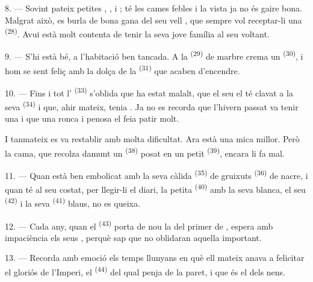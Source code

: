 8. --- Sovint pateix petites , ,
 i ; té les cames febles i la vista ja
no és gaire bona. Malgrat això, es burla de bona gana del seu vell
, que sempre vol receptar-li una 
\textsuperscript{(28)}. Avui està molt contenta de tenir la seva jove família al seu voltant.

9. --- S'hi està bé, a l'habitació ben tancada. A la 
\textsuperscript{(29)} de marbre crema un  \textsuperscript{(30)}, i hom
se sent feliç amb la dolça  de la
 \textsuperscript{(31)} que acaben d'encendre.

\VUsaut{4.2mm}
\VUsaut{3.0mm}

10. --- Fins i tot l' \textsuperscript{(33)} s'oblida que ha estat malalt, que el
seu  el té clavat a la seva  \textsuperscript{(34)} i que, ahir
mateix, tenia . Ja no es recorda que l'hivern passat va tenir una
 i que una
 ronca i penosa el feia patir molt.

I tanmateix es va restablir amb molta dificultat. Ara està una mica millor. Però la cama, que
recolza damunt un  \textsuperscript{(38)} posat en un petit 
\textsuperscript{(39)}, encara li fa mal.

11. --- Quan està ben embolicat amb la seva càlida  \textsuperscript{(35)} de
gruixuts  \textsuperscript{(36)} de nacre, i quan té al seu costat, per
llegir-li el diari, la petita
 \textsuperscript{(40)} amb la seva  blanca, el seu
 \textsuperscript{(42)} i la seva 
\textsuperscript{(41)} blaus, no es queixa.

12. --- Cada any, quan el  \textsuperscript{(43)} porta de nou la
 del primer de , espera amb impaciència els seus
, perquè sap que no oblidaran aquella  important.

13. --- Recorda amb emoció els temps llunyans en què ell mateix anava a felicitar el gloriós
 de l'Imperi, el  \textsuperscript{(44)} del qual penja de la
paret, i que és el  dels nens.
\VUsaut{6.0mm}
\VUfilet{22mm}
